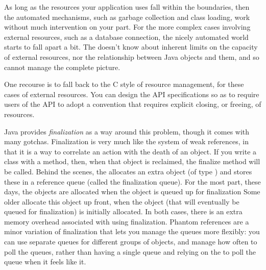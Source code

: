 As long as the resources your application uses fall within the \jress
boundaries, then the automated mechanisms, such as garbage collection and class
loading, work without much intervention on your part. For the more complex cases
involving external resources, such as a database connection, the nicely
automated world starts to fall apart a bit. The \jre doesn't know about inherent
limits on the capacity of external resources, nor the relationship between Java
objects and them, and so cannot manage the complete picture. 

One recourse is to fall back to the C style of resource management, for these
cases of external resources. You can design the API specifications so as to
require users of the API to adopt a convention that requires explicit closing,
or freeing, of resources.

Java provides \emph{finalization} as a way around this problem, though it comes
with many gotchas. Finalization is very much like the system of weak references,
in that it is a way to correlate an action with the death of an object. If you
write a class with a  method, then, when that object is
reclaimed, the finalize method will be called. Behind the scenes, the \jre
allocates an extra object (of type ) and
stores these in a reference queue (called the finalization queue). For the most
part, these days, the  objects are allocated when the
object is queued up for finalization Some older \jres allocate this object up
front, when the object (that will eventually be queued for finalization) is
initially allocated. In both cases, there is an extra memory overhead associated
with using finalization. Phantom references are a minor variation of
finalization that lets you manage the queues more flexibly: you can use separate
queues for different groups of objects, and manage how often to poll the queues,
rather than having a single queue and relying on the \jre to poll the queue when
it feels like it.

